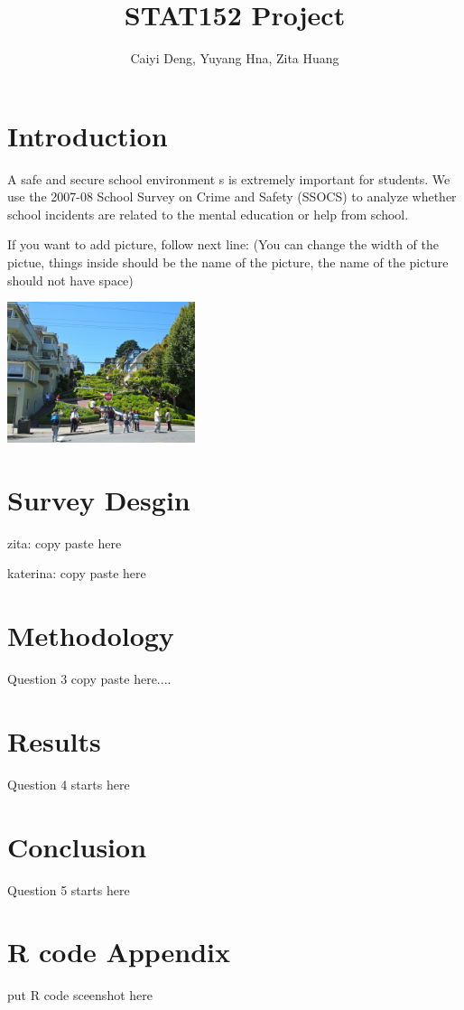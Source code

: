 \documentclass[11pt]{article}
\title{STAT152 Project}
\author {Caiyi Deng, Yuyang Hna, Zita Huang}
\begin{document}



\section{Introduction}

\vspace{0.2cm}

A safe and secure school environment s is extremely important for students.
We use the 2007-08 School Survey on Crime and Safety (SSOCS) to analyze whether school incidents are related to the mental education or help from school. 

If you want to add picture, follow next line: (You can change the width of the pictue, things inside {} should be the name of the picture, the name of the picture should not have space)

\includegraphics[width = 5.5cm]{RussianHill.jpg}


\section{Survey Desgin}

\vspace{0.2cm}

zita: copy paste here

katerina: copy paste here

\section{Methodology}

\vspace{0.2cm}

Question 3 copy paste here....


\section{Results}

\vspace{0.2cm}

Question 4 starts here

\section{Conclusion}

\vspace{0.2cm}

Question 5 starts here

\section{R code Appendix}

\vspace{0.2cm}

put R code sceenshot here 
\end{document}
